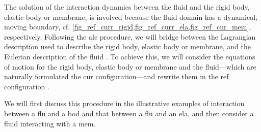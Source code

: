 The solution of the interaction dynamics between the fluid and the rigid body, elastic body or membrane, is  involved because the fluid domain has a dynamical, moving boundary, cf. \cref{fig_ref_curr_rigid,fig_ref_curr_ela,fig_ref_cur_mem}, respectively. Following the \ac{ale} procedure, we will  bridge between the Lagrangian   description used to describe the rigid body, elastic body or membrane, and the Eulerian description of the fluid  \cite{kamenskyLectureNotesMAE,doneaChapter14Arbitrary2004}. To achieve this, we will consider the equations of motion for the rigid body, elastic body or membrane and the fluid---which are naturally formulated the \ac{cur} configuration---and  rewrite them in the \ac{ref} configuration \cite{kamenskyLectureNotesMAE}.


We will first discuss this procedure in the illustrative examples of interaction between a \acl{flu} and a \acl{bod} and that between a \acl{flu} and an \acl{ela}, and then consider  a fluid  interacting with a \acl{mem}.








